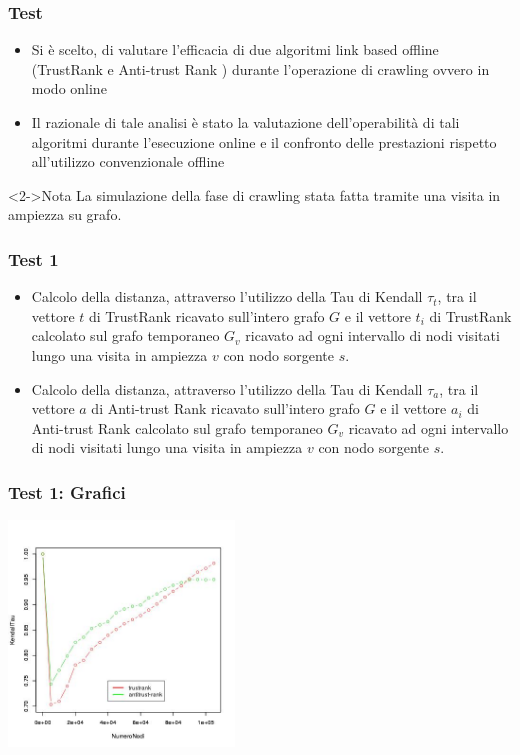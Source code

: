 \documentclass{beamer}
\begin{document}
\begin{frame}
  \frametitle{Test}
  \begin{itemize}
   \item Si è scelto, di valutare l’efficacia di due algoritmi link based offline (TrustRank e Anti-trust Rank ) durante l’operazione di crawling ovvero in modo online
   \item Il razionale di tale analisi è stato la valutazione dell’operabilità di tali algoritmi durante l’esecuzione online e
il confronto delle prestazioni rispetto all’utilizzo convenzionale offline
  \end{itemize}
  \begin{block}<2->{Nota}
   La simulazione della fase di crawling  stata fatta tramite una visita in ampiezza su grafo.
  \end{block}
\end{frame}
\begin{frame}
\frametitle{Test 1}
\begin{itemize}
 \item<1-> Calcolo della distanza, attraverso l’utilizzo della Tau di Kendall \(\tau_t\), tra il vettore \(t\) di TrustRank ricavato sull’intero grafo \(G\) e il vettore \(t_i\) di TrustRank calcolato sul grafo temporaneo \(G_v\) ricavato ad ogni intervallo di nodi visitati lungo una visita in ampiezza \(v\) con nodo sorgente \(s\).
 \item<2-> Calcolo della distanza, attraverso l’utilizzo della Tau di Kendall \(\tau_a\), tra il vettore \(a\) di Anti-trust Rank ricavato sull’intero grafo \(G\) e il vettore \(a_i\) di Anti-trust Rank calcolato sul grafo temporaneo \(G_v\) ricavato ad ogni intervallo di nodi visitati lungo una visita in ampiezza \(v\) con nodo sorgente \(s\).
\end{itemize}
\end{frame}
\begin{frame}
\frametitle{Test 1: Grafici}
\begin{center}
 \includegraphics[height=6cm]{immagini/test1/coplotTrustAnti_62}
\end{center}
\end{frame}
\end{document}

